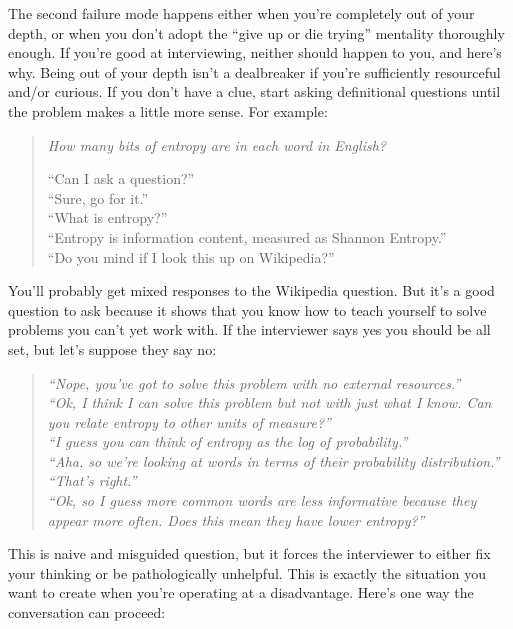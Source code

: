\documentclass{article}
\begin{document}
    The second failure mode happens either when you're completely out of your
    depth, or when you don't adopt the ``give up or die trying'' mentality
    thoroughly enough. If you're good at interviewing, neither should happen to
    you, and here's why. Being out of your depth isn't a dealbreaker if you're
    sufficiently resourceful and/or curious. If you don't have a clue, start
    asking definitional questions until the problem makes a little more sense.
    For example:

\begin{quote}
\em
How many bits of entropy are in each word in English?

``Can I ask a question?'' \\
``Sure, go for it.'' \\
``What is entropy?'' \\
``Entropy is information content, measured as Shannon Entropy.'' \\
``Do you mind if I look this up on Wikipedia?''
\end{quote}

    You'll probably get mixed responses to the Wikipedia question. But it's a
    good question to ask because it shows that you know how to teach yourself
    to solve problems you can't yet work with. If the interviewer says yes you
    should be all set, but let's suppose they say no:

\begin{quote}
\em
``Nope, you've got to solve this problem with no external resources.'' \\
``Ok, I think I can solve this problem but not with just what I know. Can
  you relate entropy to other units of measure?'' \\
``I guess you can think of entropy as the log of probability.'' \\
``Aha, so we're looking at words in terms of their probability
  distribution.'' \\
``That's right.'' \\
``Ok, so I guess more common words are less informative because they
  appear more often. Does this mean they have lower entropy?''
\end{quote}

    This is naive and misguided question, but it forces the interviewer to
    either fix your thinking or be pathologically unhelpful. This is exactly
    the situation you want to create when you're operating at a disadvantage.
    Here's one way the conversation can proceed:
\end{document}
